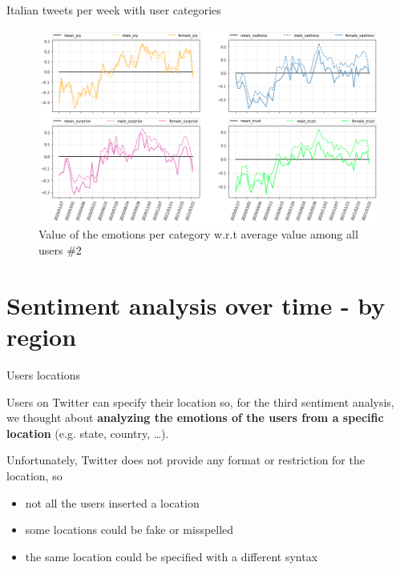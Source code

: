 \documentclass[8pt]{beamer}  %
\begin{document}
\begin{frame}{Italian tweets per week with user categories} 
	
	\begin{figure}[h]
    	\includegraphics[scale=.30]{assets/img/it_emotions_per_category_wrt_total_proportion_subplots_2.png}
    	\caption{Value of the emotions per category w.r.t average value among all users \#2}
    	\label{fig:it_emotion_weekly_per_category_proportion_subplot_2}
    \end{figure}
	
\end{frame}

\section{Sentiment analysis over time - by region}
\begin{frame}{Users locations}
    
    Users on Twitter can specify their location so, for the third sentiment analysis, we thought about \textbf{analyzing the emotions of the users from a specific location} (e.g. state, country, \ldots).
    
    Unfortunately, Twitter does not provide any format or restriction for the location, so
    \begin{itemize}
        \item not all the users inserted a location
        \item some locations could be fake or misspelled
        \item the same location could be specified with a different syntax
    \end{itemize}
    
\end{frame}
\end{document}
